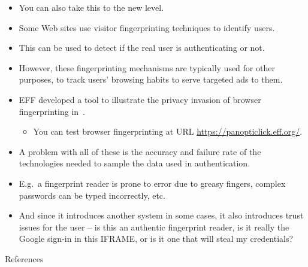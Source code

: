 \documentclass{beamer}
\begin{document}
\begin{frame}{\insertsubsectionhead}
  \begin{itemize}
    \item You can also take this to the new level.

    \item Some Web sites use visitor fingerprinting techniques to identify 
      users.

    \item This can be used to detect if the real user is authenticating or not.

    \item However, these fingerprinting mechanisms are typically used for other 
      purposes, to track users' browsing habits to serve targeted ads to them.

    \item EFF developed a tool to illustrate the privacy invasion of browser 
      fingerprinting in~\cite{Eckersley2010hui}.
      \begin{itemize}
        \item You can test browser fingerprinting at URL 
          \url{https://panopticlick.eff.org/}.
      \end{itemize}

  \end{itemize}
\end{frame}

\begin{frame}{\insertsubsectionhead}
  \begin{itemize}
    \item A problem with all of these is the accuracy and failure rate of the 
      technologies needed to sample the data used in authentication.

    \item E.g.\ a fingerprint reader is prone to error due to greasy fingers, 
      complex passwords can be typed incorrectly, etc.

    \item And since it introduces another system in some cases, it also 
      introduces trust issues for the user -- is this an authentic fingerprint 
      reader, is it really the Google sign-in in this IFRAME, or is it one that 
      will steal my credentials?

  \end{itemize}
\end{frame}




\begin{frame}{References}
	\small
  \printbibliography{}
\end{frame}
\end{document}
